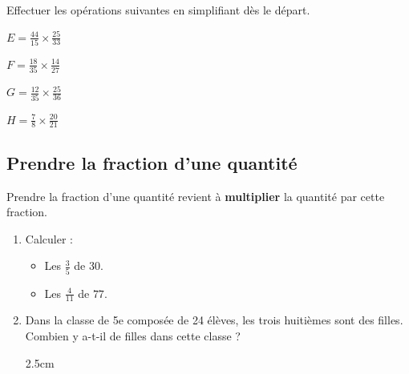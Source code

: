 \documentclass[a4paper]{book}
\begin{document}
    
    \begin{exemple}
        Effectuer les opérations suivantes en simplifiant dès le départ.\medskip

        \begin{minipage}{0.24\linewidth}
            $E = \frac{44}{15} \times \frac{25}{33}$

            \vspace{4cm}
        \end{minipage}
        \hfill\vline \hfill
        \begin{minipage}{0.24\linewidth}
            $F = \frac{18}{35} \times \frac{14}{27}$

            \vspace{4cm}
        \end{minipage}
        \hfill\vline \hfill
        \begin{minipage}{0.24\linewidth}
            $G = \frac{12}{35} \times \frac{25}{36}$   

            \vspace{4cm}
        \end{minipage}
        \hfill\vline \hfill
        \begin{minipage}{0.24\linewidth}
            $H = \frac{7}{8} \times \frac{20}{21}$

            \vspace{4cm}
        \end{minipage}
    \end{exemple}

    
\subsection{Prendre la fraction d'une quantité}
    
    \begin{propriete}
        Prendre la fraction d'une quantité revient à \textbf{multiplier} la quantité par cette fraction.
    \end{propriete}
    
    
    \begin{exemple}
        \begin{enumerate}
            \item Calculer :
            \begin{itemize}
                \item Les $\frac{3}{5}$ de $30$.
                \item Les $\frac{4}{11}$ de $77$.
            \end{itemize}
            \item Dans la classe de 5e composée de 24 élèves, les trois huitièmes sont des filles. Combien y a-t-il de filles dans cette classe ?

            \begin{ZoneReponse} {2.5cm}
            \end{ZoneReponse}
        \end{enumerate}
    \end{exemple}
    
\end{document}
